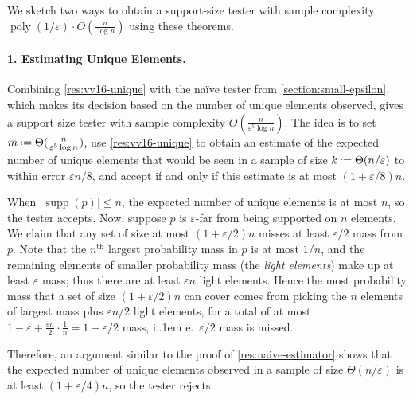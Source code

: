 \documentclass[10pt,a4paper]{article}
\newcommand*\ie{i.\kern.1em e.\ }
\newcommand{\ignore}[1]{}
\DeclareMathOperator{\supp}{supp}   %
\DeclareMathOperator{\poly}{poly}
\newcommand{\Ex}[1]{\bE \left[ #1 \right]}
\newcommand*{\define}{\mathrel{\vcenter{\baselineskip0.5ex \lineskiplimit0pt
                      \hbox{\scriptsize.}\hbox{\scriptsize.}}}%
                      =}
\newcommand{\ind}[1]{\mathds{1} \left[ #1 \right] }
\newcommand{\bE}{\ensuremath{\mathbb{E}}}
\newcommand{\bN}{\ensuremath{\mathbb{N}}}
\renewcommand{\epsilon}{\varepsilon}
\begin{document}
We sketch two ways to obtain a support-size tester with sample complexity $\poly(1/\epsilon) \cdot
O(\tfrac{n}{\log n})$ using these theorems.

\paragraph*{1. Estimating Unique Elements.} Combining \cref{res:vv16-unique} with
the na\"ive tester from \cref{section:small-epsilon}, which makes its decision based on the number of
unique elements observed, gives a support size tester with sample complexity $O(\frac{n}{\epsilon^5
\log n})$. The idea is to set $m \define \Theta(\frac{n}{\epsilon^5 \log n})$, use
\cref{res:vv16-unique} to obtain an estimate of the expected number of unique elements that would be
seen in a sample of size $k \define \Theta(n/\epsilon)$ to within error $\epsilon n / 8$, and accept
if and only if this estimate is at most $(1 + \epsilon/8) n$.

When $|\supp(p)| \le n$, the expected number of unique elements is at most $n$, so the tester
accepts. Now, suppose $p$ is $\epsilon$-far from being supported on $n$ elements. We claim that any
set of size at most $(1 + \epsilon/2) n$ misses at least $\epsilon / 2$ mass from $p$. Note that the
$n^{\text{th}}$ largest probability mass in $p$ is at most $1/n$, and the remaining elements of
smaller probability mass (the \emph{light elements}) make up at least $\epsilon$ mass; thus there
are at least $\epsilon n$ light elements. Hence the most probability mass that a set of size
$(1+\epsilon/2) n$ can cover comes from picking the $n$ elements of largest mass plus $\epsilon n /
2$ light elements, for a total of at most $1 - \epsilon + \frac{\epsilon n}{2} \cdot \frac{1}{n} = 1
- \epsilon/2$ mass, \ie $\epsilon/2$ mass is missed.

Therefore, an argument similar to the proof of \cref{res:naive-estimator} shows that the expected
number of unique elements observed in a sample of size $\Theta(n/\epsilon)$ is at least $(1 +
\epsilon/4) n$, so the tester rejects.

\ignore{
\footnote{Let $\bm{X}_i$ indicate whether a new unique element was observed in
    the $i^{\text{th}}$ step, let $\bm{S}_i \define \sum_{j \le i} \bm{X}_i$ be the number of unique
    elements seen in the first $i$ steps, and let $\bm{Y}_i \define \ind{\bm{S}_{i-1} \ge
    (1+\epsilon/2)n \text{ or } \bm{X}_i = 1}$. Then for any $m \in \bN$, $\bm{S}_m \ge
    (1+\epsilon/2)n$ if and only if $\sum_{i \le m} \bm{Y}_i \ge (1+\epsilon/2)n$. Moreover, for any
    setting of $(\bm{Y}_j)_{j<i} = (y_j)_{j<i}$, the conditioned random variable $\bm{Y}_i \,|\,
    (\bm{Y}_j)_{j<i} = (y_j)_{j<i}$ stochastically dominates a Bernoulli random variable with
    parameter $\epsilon/2$ (because either $(1+\epsilon/2)n$ unique elements have been observed, or
    the unseen elements make up at least $\epsilon/2$ mass). Hence a Chernoff bound implies that,
    for $k = \Theta(n/\epsilon)$, $\sum_{i \le k} \bm{Y}_i \ge 2n$ with probability at least $1 -
e^{-\Omega(n)}$. Therefore $\Ex{\bm{S}_k} \ge (1 - e^{-\Omega(n)}) (1+\epsilon/2) n > (1+\epsilon/4)
n$.}
}
\end{document}
